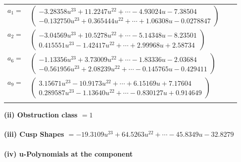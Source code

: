 \documentclass[1p]{elsarticle_modified}
\theoremstyle{definition}
\begin{document}
\begin{tabular}{m{7pt} m{180pt} m{7pt} m{180pt} }
\flushright $a_{1}=$&$\begin{pmatrix}-3.28358 u^{23}+11.2247 u^{22}+\cdots-4.93024 u-7.38504\\-0.132750 u^{23}+0.365444 u^{22}+\cdots+1.06308 u-0.0278847\end{pmatrix}$ \\
\flushright $a_{2}=$&$\begin{pmatrix}-3.04569 u^{23}+10.5278 u^{22}+\cdots-5.14348 u-8.23501\\0.415551 u^{23}-1.42417 u^{22}+\cdots+2.99968 u+2.58734\end{pmatrix}$ \\
\flushright $a_{6}=$&$\begin{pmatrix}-1.13356 u^{23}+3.73009 u^{22}+\cdots-1.83336 u-2.03684\\-0.561956 u^{23}+2.08239 u^{22}+\cdots-0.145765 u-0.429411\end{pmatrix}$ \\
\flushright $a_{9}=$&$\begin{pmatrix}3.15671 u^{23}-10.9173 u^{22}+\cdots+6.15169 u+7.17604\\0.289587 u^{23}-1.13640 u^{22}+\cdots-0.830127 u+0.914649\end{pmatrix}$\\&\end{tabular}
\flushleft \textbf{(ii) Obstruction class $= 1$}\\~\\
\flushleft \textbf{(iii) Cusp Shapes $= -19.3109 u^{23}+64.5263 u^{22}+\cdots-45.8349 u-32.8279$}\\~\\
\newpage\renewcommand{\arraystretch}{1}
\flushleft \textbf{(iv) u-Polynomials at the component}\newline \\
\end{document}
